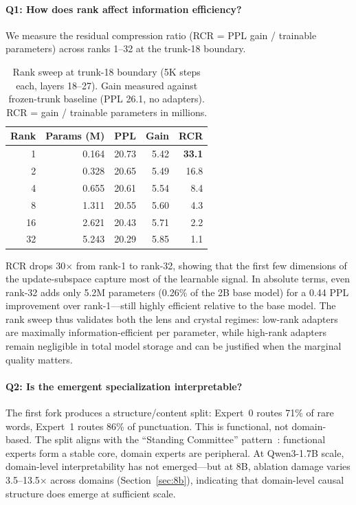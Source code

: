 \documentclass{article}
\begin{document}
\paragraph{Q1: How does rank affect information efficiency?}
We measure the residual compression ratio (RCR = PPL gain / trainable
parameters) across ranks 1--32 at the trunk-18 boundary.
\begin{table}[h]
\centering
\caption{Rank sweep at trunk-18 boundary (5K steps each, layers 18--27).
Gain measured against frozen-trunk baseline (PPL 26.1, no adapters).
RCR = gain / trainable parameters in millions.}
\label{tab:rank-sweep}
\begin{tabular}{@{}rrrrr@{}}
\toprule
Rank & Params (M) & PPL & Gain & RCR \\
\midrule
1  & 0.164 & 20.73 & 5.42 & \textbf{33.1} \\
2  & 0.328 & 20.65 & 5.49 & 16.8 \\
4  & 0.655 & 20.61 & 5.54 & 8.4 \\
8  & 1.311 & 20.55 & 5.60 & 4.3 \\
16 & 2.621 & 20.43 & 5.71 & 2.2 \\
32 & 5.243 & 20.29 & 5.85 & 1.1 \\
\bottomrule
\end{tabular}
\end{table}

RCR drops 30$\times$ from rank-1 to rank-32, showing that the first few
dimensions of the update-subspace capture most of the learnable signal. In
absolute terms, even rank-32 adds only 5.2M parameters (0.26\% of the 2B base
model) for a 0.44 PPL improvement over rank-1---still highly efficient
relative to the base model. The rank sweep thus validates both the lens and
crystal regimes: low-rank adapters are maximally information-efficient per
parameter, while high-rank adapters remain negligible in total model storage
and can be justified when the marginal quality matters.

\paragraph{Q2: Is the emergent specialization interpretable?}
The first fork produces a structure/content split: Expert~0 routes 71\% of
rare words, Expert~1 routes 86\% of punctuation. This is functional, not
domain-based. The split aligns with the ``Standing Committee''
pattern~\cite{standing2026}: functional experts form a stable core, domain
experts are peripheral. At Qwen3-1.7B scale, domain-level interpretability
has not emerged---but at 8B, ablation damage varies 3.5--13.5$\times$
across domains (Section~\ref{sec:8b}), indicating that domain-level causal
structure does emerge at sufficient scale.
\end{document}

